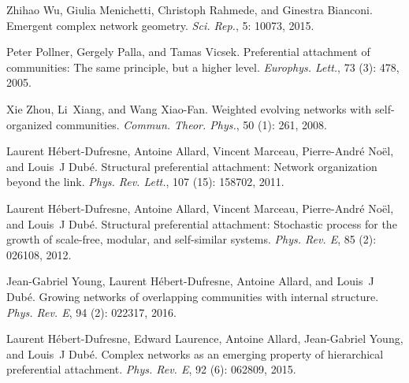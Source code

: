 Zhihao Wu, Giulia Menichetti, Christoph Rahmede, and Ginestra Bianconi.
\newblock Emergent complex network geometry.
\newblock \emph{Sci. Rep.}, 5: 10073, 2015.

Peter Pollner, Gergely Palla, and Tamas Vicsek.
\newblock Preferential attachment of communities: {{The}} same principle, but a
higher level.
\newblock \emph{Europhys. Lett.}, 73 (3): 478, 2005.

Xie Zhou, Li~Xiang, and Wang {Xiao-Fan}.
\newblock Weighted evolving networks with self-organized communities.
\newblock \emph{Commun. Theor. Phys.}, 50 (1): 261, 2008.

Laurent {H{\'e}bert-Dufresne}, Antoine Allard, Vincent Marceau,
Pierre-Andr{\'e} No{\"e}l, and Louis~J Dub{\'e}.
\newblock Structural preferential attachment: {{Network}} organization beyond
the link.
\newblock \emph{Phys. Rev. Lett.}, 107 (15): 158702, 2011.

Laurent {H{\'e}bert-Dufresne}, Antoine Allard, Vincent Marceau,
Pierre-Andr{\'e} No{\"e}l, and Louis~J Dub{\'e}.
\newblock Structural preferential attachment: {{Stochastic}} process for the
growth of scale-free, modular, and self-similar systems.
\newblock \emph{Phys. Rev. E}, 85 (2): 026108, 2012.

Jean-Gabriel Young, Laurent {H{\'e}bert-Dufresne}, Antoine Allard, and Louis~J
Dub{\'e}.
\newblock Growing networks of overlapping communities with internal structure.
\newblock \emph{Phys. Rev. E}, 94 (2): 022317, 2016.

Laurent {H{\'e}bert-Dufresne}, Edward Laurence, Antoine Allard, Jean-Gabriel
Young, and Louis~J Dub{\'e}.
\newblock Complex networks as an emerging property of hierarchical preferential
attachment.
\newblock \emph{Phys. Rev. E}, 92 (6): 062809, 2015.

